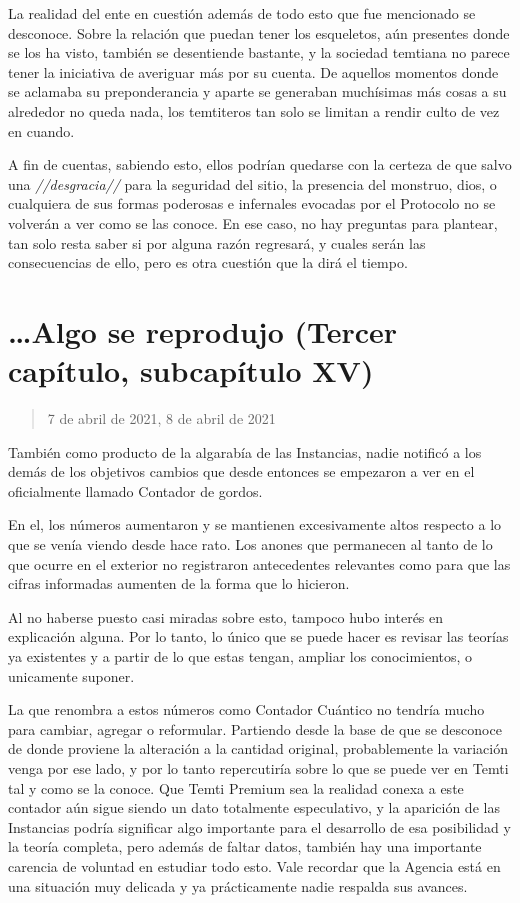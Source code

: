 \documentclass[
  spanish,
]{book}
\begin{document}
La realidad del ente en cuestión además de todo esto que fue mencionado se desconoce.
Sobre la relación que puedan tener los esqueletos, aún presentes donde se los ha visto, también se desentiende bastante, y la sociedad temtiana no parece tener la iniciativa de averiguar más por su cuenta. De aquellos momentos donde se aclamaba su preponderancia y aparte se generaban muchísimas más cosas a su alrededor no queda nada, los temtiteros tan solo se limitan a rendir culto de vez en cuando.

A fin de cuentas, sabiendo esto, ellos podrían quedarse con la certeza de que salvo una \emph{//desgracia//} para la seguridad del sitio, la presencia del monstruo, dios, o cualquiera de sus formas poderosas e infernales evocadas por el Protocolo no se volverán a ver como se las conoce. En ese caso, no hay preguntas para plantear, tan solo resta saber si por alguna razón regresará, y cuales serán las consecuencias de ello, pero es otra cuestión que la dirá el tiempo.

\hypertarget{algo-se-reprodujo-tercer-capuxedtulo-subcapuxedtulo-xv}{%
\section{\ldots Algo se reprodujo (Tercer capítulo, subcapítulo XV)}\label{algo-se-reprodujo-tercer-capuxedtulo-subcapuxedtulo-xv}}

\begin{quote}
7 de abril de 2021, 8 de abril de 2021
\end{quote}

También como producto de la algarabía de las Instancias, nadie notificó a los demás de los objetivos cambios que desde entonces se empezaron a ver en el oficialmente llamado Contador de gordos.

En el, los números aumentaron y se mantienen excesivamente altos respecto a lo que se venía viendo desde hace rato.
Los anones que permanecen al tanto de lo que ocurre en el exterior no registraron antecedentes relevantes como para que las cifras informadas aumenten de la forma que lo hicieron.

Al no haberse puesto casi miradas sobre esto, tampoco hubo interés en explicación alguna. Por lo tanto, lo único que se puede hacer es revisar las teorías ya existentes y a partir de lo que estas tengan, ampliar los conocimientos, o unicamente suponer.

La que renombra a estos números como Contador Cuántico no tendría mucho para cambiar, agregar o reformular. Partiendo desde la base de que se desconoce de donde proviene la alteración a la cantidad original, probablemente la variación venga por ese lado, y por lo tanto repercutiría sobre lo que se puede ver en Temti tal y como se la conoce. Que Temti Premium sea la realidad conexa a este contador aún sigue siendo un dato totalmente especulativo, y la aparición de las Instancias podría significar algo importante para el desarrollo de esa posibilidad y la teoría completa, pero además de faltar datos, también hay una importante carencia de voluntad en estudiar todo esto. Vale recordar que la Agencia está en una situación muy delicada y ya prácticamente nadie respalda sus avances.
\end{document}
